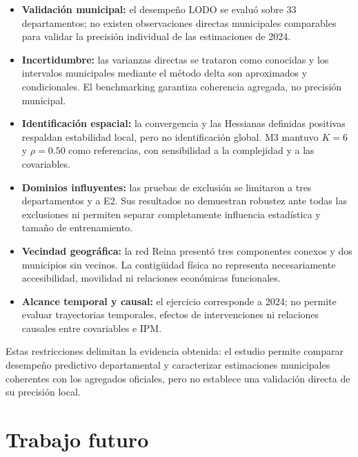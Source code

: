 \begin{itemize}
\setlength{\itemsep}{2pt}

\item \textbf{Validación municipal:} el desempeño LODO se evaluó sobre 33 departamentos; no existen observaciones directas municipales comparables para validar la precisión individual de las estimaciones de 2024.

\item \textbf{Incertidumbre:} las varianzas directas se trataron como conocidas y los intervalos municipales mediante el método delta son aproximados y condicionales. El benchmarking garantiza coherencia agregada, no precisión municipal.

\item \textbf{Identificación espacial:} la convergencia y las Hessianas definidas positivas respaldan estabilidad local, pero no identificación global. M3 mantuvo $K=6$ y $\rho=0.50$ como referencias, con sensibilidad a la complejidad y a las covariables.

\item \textbf{Dominios influyentes:} las pruebas de exclusión se limitaron a tres departamentos y a E2. Sus resultados no demuestran robustez ante todas las exclusiones ni permiten separar completamente influencia estadística y tamaño de entrenamiento.

\item \textbf{Vecindad geográfica:} la red Reina presentó tres componentes conexos y dos municipios sin vecinos. La contigüidad física no representa necesariamente accesibilidad, movilidad ni relaciones económicas funcionales.

\item \textbf{Alcance temporal y causal:} el ejercicio corresponde a 2024; no permite evaluar trayectorias temporales, efectos de intervenciones ni relaciones causales entre covariables e IPM.

\end{itemize}

Estas restricciones delimitan la evidencia obtenida: el estudio permite comparar desempeño predictivo departamental y caracterizar estimaciones municipales coherentes con los agregados oficiales, pero no establece una validación directa de su precisión local.

\section{Trabajo futuro}
\label{sec:trabajo-futuro}

